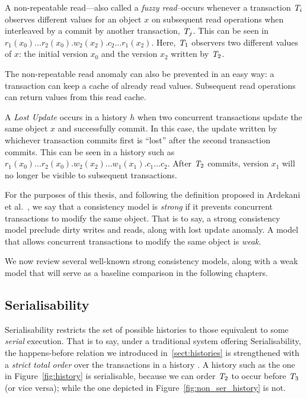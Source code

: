 \begin{definition}
A non-repeatable read---also called a \emph{fuzzy read}--occurs whenever a transaction $\mathit{T}_i$ observes different values for an object $x$ on subsequent read operations when interleaved by a commit by another transaction, $\mathit{T}_j$. This can be seen in $r_1(x_0)\ldots r_2(x_0).w_2(x_2).c_2 \ldots r_1(x_2)$. Here, $\mathit{T}_1$ observers two different values of $x$: the initial version $x_0$ and the version $x_2$ written by $\mathit{T}_2$.
\end{definition}

The non-repeatable read anomaly can also be prevented in an easy way: a transaction can keep a cache of already read values. Subsequent read operations can return values from this read cache.

\begin{definition}
A \emph{Lost Update} occurs in a history $h$ when two concurrent transactions update the same object $x$ and successfully commit. In this case, the update written by whichever transaction commits first is ``lost'' after the second transaction commits. This can be seen in a history such as $r_1(x_0)\ldots r_2(x_0).w_2(x_2) \ldots w_1(x_1).c_1\ldots c_2$. After $\mathit{T}_2$ commits, version $x_1$ will no longer be visible to subsequent transactions.
\end{definition}

For the purposes of this thesis, and following the definition proposed in Ardekani et al.~\citep{ardekani_thesis}, we say that a consistency model is \emph{strong} if it prevents concurrent transactions to modify the same object. That is to say, a strong consistency model preclude dirty writes and reads, along with lost update anomaly. A model that allows concurrent transactions to modify the same object is \emph{weak}.

We now review several well-known strong consistency models, along with a weak model that will serve as a baseline comparison in the following chapters.

\subsection{Serialisability}

Serialisability restricts the set of possible histories to those equivalent to some \emph{serial} execution. That is to say, under a traditional system offering Serialisability, the happens-before relation we introduced in~\ref{sect:histories} is strengthened with a \emph{strict total order} over the transactions in a history . A history such as the one in Figure~\ref{fig:history} is serialisable, because we can order $\mathit{T}_2$ to occur before $\mathit{T}_3$ (or vice versa); while the one depicted in Figure~\ref{fig:non_ser_history} is not.

